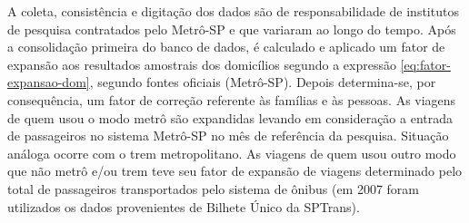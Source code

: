 A coleta, consistência e digitação dos dados são de responsabilidade de institutos de pesquisa contratados pelo Metrô-SP e que variaram ao longo do tempo. Após a consolidação primeira do banco de dados, é calculado e aplicado um fator de expansão aos resultados amostrais dos domicílios segundo a expressão \eqref{eq:fator-expansao-dom}, segundo fontes oficiais (Metrô-SP).
Depois determina-se, por consequência, um fator de correção referente às famílias e às pessoas. As viagens de quem usou o modo metrô são expandidas levando em consideração a entrada de passageiros no sistema Metrô-SP no mês de referência da pesquisa. Situação análoga ocorre com o trem metropolitano. As viagens de quem usou outro modo que não metrô e/ou trem teve seu fator de expansão de viagens determinado pelo total de passageiros transportados pelo sistema de ônibus (em 2007 foram utilizados os dados provenientes de Bilhete Único da SPTrans).
\clearpage

